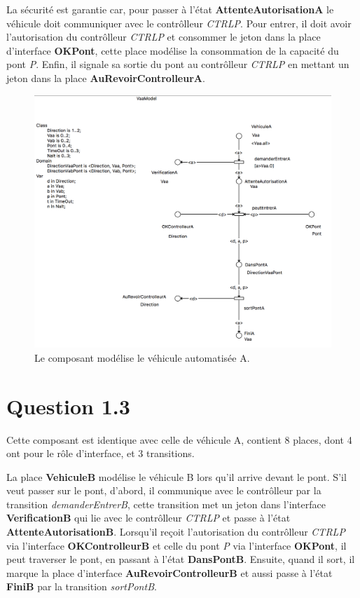 \documentclass[a4paper,11pt]{report}
\begin{document}
	La sécurité est garantie car, pour passer à l'état \textbf{AttenteAutorisationA} le véhicule doit communiquer avec le contrôlleur \textit{CTRLP}. Pour entrer, il doit avoir l'autorisation du contrôlleur \textit{CTRLP} et consommer le jeton dans la place d'interface \textbf{OKPont},  cette place modélise la consommation de la capacité du pont \textit{P}. Enfin, il signale sa sortie du pont au contrôlleur \textit{CTRLP} en mettant un jeton dans la place \textbf{AuRevoirControlleurA}.

	\begin{figure}[!htbp]
		\centering
		\includegraphics[width = 15cm]{vaaModel.png}
		\caption{Le composant modélise le véhicule automatisée A.}
	\end{figure}
	\newpage
	
\section{Question 1.3}
	Cette composant est identique avec celle de véhicule A, contient 8 places, dont 4 ont pour le rôle d'interface, et 3 transitions.
	
	La place \textbf{VehiculeB} modélise le véhicule B  lors qu'il arrive devant le pont. S'il veut passer sur le pont, d'abord, il communique avec le contrôlleur par la transition \textit{demanderEntrerB}, cette transition met un jeton dans l'interface \textbf{VerificationB} qui lie avec le contrôlleur \textit{CTRLP} et passe à l'état \textbf{AttenteAutorisationB}. Lorsqu'il reçoit l'autorisation du contrôlleur \textit{CTRLP} via l'interface \textbf{OKControlleurB} et celle du pont \textit{P} via l'interface \textbf{OKPont}, il peut traverser le pont, en passant à l'état \textbf{DansPontB}. Ensuite, quand il sort, il marque la place d'interface \textbf{AuRevoirControlleurB} et aussi passe à l'état \textbf{FiniB} par la transition \textit{sortPontB}.
	
\end{document}
